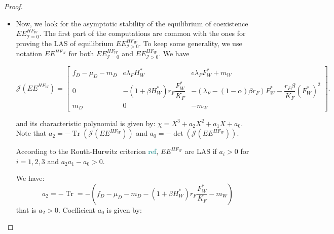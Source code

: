 \documentclass{article}
\newcommand{\lfw}{\lambda_{F}}
\newcommand{\lfw}{\lambda_{F}}
\newcommand{\cI}{\mathcal{I}}
\newcommand{\marc}[1]{\textcolor{teal}{#1}}
\DeclareMathOperator{\Tr}{Tr}
\begin{document}
\begin{proof}
\begin{itemize}
\item Now, we look for the asymptotic stability of the equilibrium of coexistence $EE^{HF_W}_{\cI=0}$. The first part of the computations are common with the ones for proving the LAS of equilibrium $EE^{HF_W}_{\cI >0}$.   To keep some generality, we use notation $EE^{HF_W}$ for both $EE^{HF_W}_{\cI =0}$ and $EE^{HF_W}_{\cI >0}$. We have


\begin{equation*}
\mathcal{J}(EE^{H F_W}) = \begin{bmatrix}
f_D -\mu_D - m_D & e \lfw H_W^* & e \lfw F^*_W +m_W \\
0 & -(1 + \beta H_W^*)r_F \dfrac{F_W^*}{K_F} & - (\lfw - (1-\alpha)\beta r_F) F_W^* -  \dfrac{r_F\beta}{K_F} (F_W^*)^2 \\
m_D & 0 & -m_W
\end{bmatrix}.
\end{equation*} 

and its characteristic polynomial is given by: $\chi = X^3 + a_2 X^2 + a_1 X + a_0$. Note that $a_2 = - \Tr(\mathcal{J}(EE^{H F_W}))$ and $a_0 = - \det (\mathcal{J}(EE^{H F_W}))$.

According to the Routh-Hurwitz criterion \marc{ref}, $EE^{H F_W}$ are LAS if $a_i > 0$ for $i=1,2,3$ and $a_2 a_1 - a_0 > 0$.

We have:
\begin{equation}\label{expressionA2}
a_2 = - \Tr = -(f_D - \mu_D - m_D - (1+\beta H_W^*)r_F \dfrac{F_W^*}{K_F} - m_W)
\end{equation}
that is $a_2>0$. Coefficient $a_0$ is given by:


\end{itemize}
\end{proof}
\end{document}
